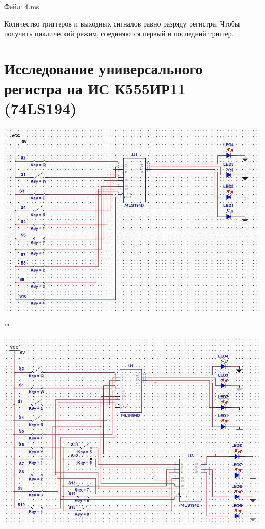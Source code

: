 \documentclass[a4paper,12pt]{article}
\begin{document}
\noindent Файл: 4.ms\newline

\noindent Количество триггеров и выходных сигналов равно разряду регистра. Чтобы получить циклический режим, соединяются первый и последний триггер. 

\section{Исследование универсального регистра на ИС К555ИР11 (74LS194)}

\begin{center}
	\includegraphics[scale=0.6]{../screens/5.jpg}
	
	""\newline
	
	\includegraphics[scale=0.6]{../screens/6.jpg}
\end{center}
\end{document}
